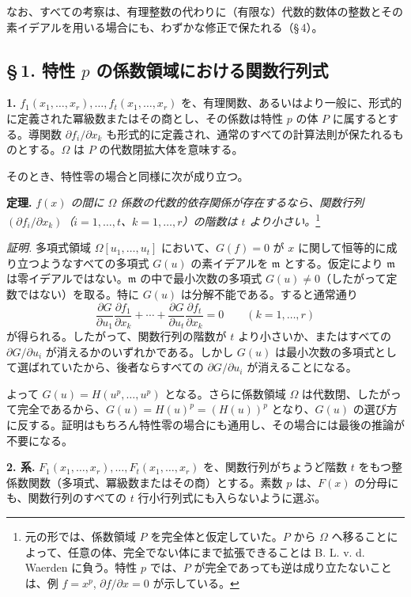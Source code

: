 なお、すべての考察は、有理整数の代わりに（有限な）代数的数体の整数とその素イデアルを用いる場合にも、わずかな修正で保たれる（\S\,4）。

\subsection*{\S\,1. 特性 $p$ の係数領域における関数行列式}

\noindent\textbf{1.}
$f_1(x_1,\ldots,x_r),\ldots,f_t(x_1,\ldots,x_r)$ を、有理関数、あるいはより一般に、形式的に定義された冪級数またはその商とし、その係数は特性 $p$ の体 $P$ に属するとする。導関数 $\partial f_i/\partial x_k$ も形式的に定義され、通常のすべての計算法則が保たれるものとする。$\Omega$ は $P$ の代数閉拡大体を意味する。

そのとき、特性零の場合と同様に次が成り立つ。

\noindent\textbf{定理.}
\emph{$f(x)$ の間に $\Omega$ 係数の代数的依存関係が存在するなら、関数行列 $(\partial f_i/\partial x_k)$（$i=1,\ldots,t$、$k=1,\ldots,r$）の階数は $t$ より小さい。}\footnote{元の形では、係数領域 $P$ を完全体と仮定していた。$P$ から $\Omega$ へ移ることによって、任意の体、完全でない体にまで拡張できることは B. L. v. d. Waerden に負う。特性 $p$ では、$P$ が完全であっても逆は成り立たないことは、例 $f=x^p$, $\partial f/\partial x=0$ が示している。}

\noindent\emph{証明.}
多項式領域 $\Omega[u_1,\ldots,u_t]$ において、$G(f)=0$ が $x$ に関して恒等的に成り立つようなすべての多項式 $G(u)$ の素イデアルを $\mathfrak{m}$ とする。仮定により $\mathfrak{m}$ は零イデアルではない。$\mathfrak{m}$ の中で最小次数の多項式 $G(u)\ne0$（したがって定数ではない）を取る。特に $G(u)$ は分解不能である。すると通常通り
\[
\frac{\partial G}{\partial u_1}\frac{\partial f_1}{\partial x_k}+\cdots+
\frac{\partial G}{\partial u_t}\frac{\partial f_t}{\partial x_k}=0
\qquad(k=1,\ldots,r)
\]
が得られる。したがって、関数行列の階数が $t$ より小さいか、またはすべての $\partial G/\partial u_i$ が消えるかのいずれかである。しかし $G(u)$ は最小次数の多項式として選ばれていたから、後者ならすべての $\partial G/\partial u_i$ が消えることになる。

よって $G(u)=H(u^p,\ldots,u^p)$ となる。さらに係数領域 $\Omega$ は代数閉、したがって完全であるから、$G(u)=H(u)^p=(H(u))^p$ となり、$G(u)$ の選び方に反する。証明はもちろん特性零の場合にも通用し、その場合には最後の推論が不要になる。

\medskip\noindent\textbf{2. 系.}
$F_1(x_1,\ldots,x_r),\ldots,F_t(x_1,\ldots,x_r)$ を、関数行列がちょうど階数 $t$ をもつ整係数関数（多項式、冪級数またはその商）とする。素数 $p$ は、$F(x)$ の分母にも、関数行列のすべての $t$ 行小行列式にも入らないように選ぶ。

